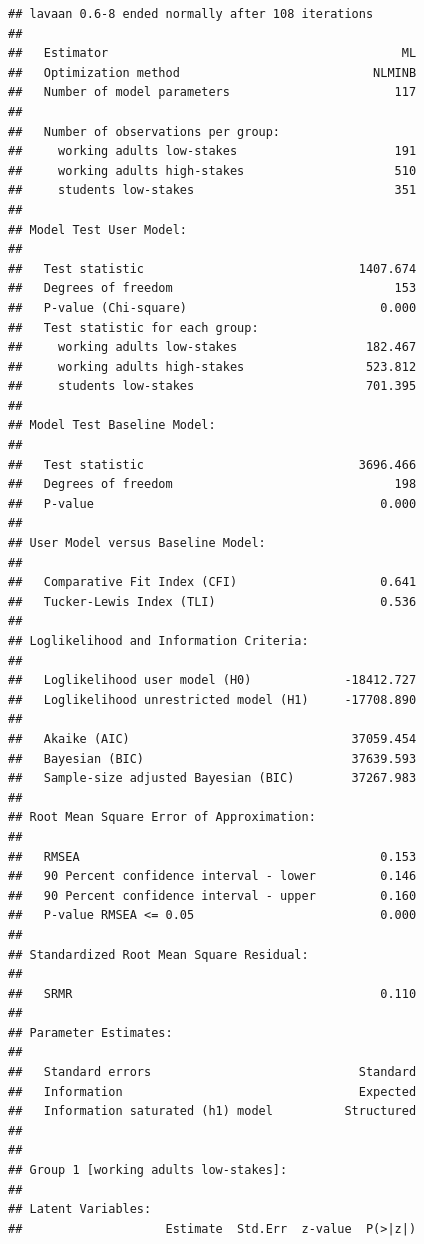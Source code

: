 \documentclass[
  english,
  man]{apa6}
\begin{document}
\begin{verbatim}
## lavaan 0.6-8 ended normally after 108 iterations
## 
##   Estimator                                         ML
##   Optimization method                           NLMINB
##   Number of model parameters                       117
##                                                       
##   Number of observations per group:                   
##     working adults low-stakes                      191
##     working adults high-stakes                     510
##     students low-stakes                            351
##                                                       
## Model Test User Model:
##                                                       
##   Test statistic                              1407.674
##   Degrees of freedom                               153
##   P-value (Chi-square)                           0.000
##   Test statistic for each group:
##     working adults low-stakes                  182.467
##     working adults high-stakes                 523.812
##     students low-stakes                        701.395
## 
## Model Test Baseline Model:
## 
##   Test statistic                              3696.466
##   Degrees of freedom                               198
##   P-value                                        0.000
## 
## User Model versus Baseline Model:
## 
##   Comparative Fit Index (CFI)                    0.641
##   Tucker-Lewis Index (TLI)                       0.536
## 
## Loglikelihood and Information Criteria:
## 
##   Loglikelihood user model (H0)             -18412.727
##   Loglikelihood unrestricted model (H1)     -17708.890
##                                                       
##   Akaike (AIC)                               37059.454
##   Bayesian (BIC)                             37639.593
##   Sample-size adjusted Bayesian (BIC)        37267.983
## 
## Root Mean Square Error of Approximation:
## 
##   RMSEA                                          0.153
##   90 Percent confidence interval - lower         0.146
##   90 Percent confidence interval - upper         0.160
##   P-value RMSEA <= 0.05                          0.000
## 
## Standardized Root Mean Square Residual:
## 
##   SRMR                                           0.110
## 
## Parameter Estimates:
## 
##   Standard errors                             Standard
##   Information                                 Expected
##   Information saturated (h1) model          Structured
## 
## 
## Group 1 [working adults low-stakes]:
## 
## Latent Variables:
##                    Estimate  Std.Err  z-value  P(>|z|)

\end{verbatim}
\end{document}
